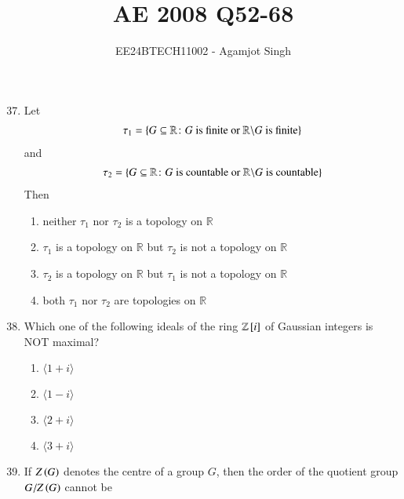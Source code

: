 \documentclass[journal,onecolumn]{IEEEtran}
\theoremstyle{remark}
\begin{document}

\vspace{3cm}

\title{AE 2008 Q52-68}
\author{EE24BTECH11002 - Agamjot Singh}
\maketitle

\renewcommand{\thefigure}{\theenumi}
\renewcommand{\thetable}{\theenumi}

\begin{enumerate}
    \setcounter{enumi}{36}

    \item Let
	\begin{align*}
		\tau_1 = \left\{G \subseteq \mathbb{R} \colon G \text{ is finite or } \mathbb{R} \backslash G \text{ is finite}\right\}	
	\end{align*} 
	and
	\begin{align*}
		\tau_2 = \left\{G \subseteq \mathbb{R} \colon G \text{ is countable or } \mathbb{R} \backslash G \text{ is countable}\right\}	
	\end{align*}
	Then

	\begin{enumerate}
		\item neither $\tau_1$ nor $\tau_2$ is a topology on $\mathbb{R}$
		\item $\tau_1$ is a topology on $\mathbb{R}$ but $\tau_2$ is not a topology on $\mathbb{R}$
		\item $\tau_2$ is a topology on $\mathbb{R}$ but $\tau_1$ is not a topology on $\mathbb{R}$
		\item both $\tau_1$ nor $\tau_2$ are topologies on $\mathbb{R}$
	\end{enumerate}

    \item Which one of the following ideals of the ring $\mathbb{Z}{}\left[i\right]$ of Gaussian integers is NOT maximal?

	\begin{enumerate}
		\item $\langle 1 + i \rangle$
		\item $\langle 1 - i \rangle$
		\item $\langle 2 + i \rangle$
		\item $\langle 3 + i \rangle$
	\end{enumerate}

    \item If $Z\left(G\right)$ denotes the centre of a group $G$, then the order of the quotient group $G/Z\left(G\right)$ cannot be


\end{enumerate}
\end{document}
